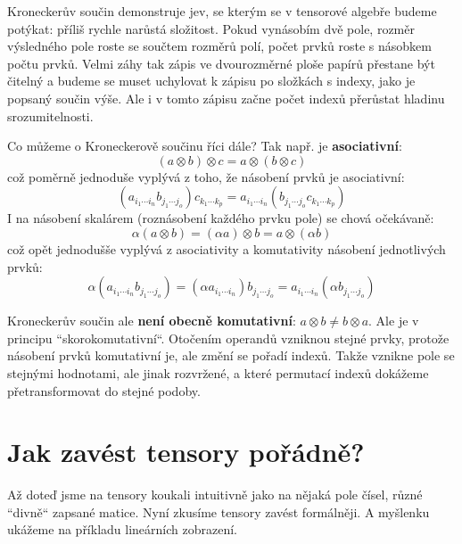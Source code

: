 \documentclass[a5paper,12pt]{amsbook}
\theoremstyle{definition}
\begin{document}
Kroneckerův součin demonstruje jev, se kterým se v tensorové algebře budeme potýkat: příliš rychle
narůstá složitost. Pokud vynásobím dvě pole, rozměr výsledného pole roste se součtem rozměrů polí,
počet prvků roste s násobkem počtu prvků. Velmi záhy tak zápis ve dvourozměrné ploše papírů přestane
být čitelný a budeme se muset uchylovat k zápisu po složkách s indexy, jako je popsaný součin výše.
Ale i v tomto zápisu začne počet indexů přerůstat hladinu srozumitelnosti.

Co můžeme o Kroneckerově součinu říci dále? Tak např. je \textbf{asociativní}:
\begin{equation*}
(a \otimes b) \otimes c = a \otimes (b \otimes c)
\end{equation*}
což poměrně jednoduše vyplývá z toho, že násobení prvků je asociativní:
\begin{equation*}
(a_{i_1 \cdots i_n} b_{j_1 \cdots j_o})c_{k_1 \cdots k_p} = a_{i_1 \cdots i_n} (b_{j_1 \cdots j_o} c_{k_1 \cdots k_p})
\end{equation*}
I na násobení skalárem (roznásobení každého prvku pole) se chová očekávaně:
\begin{equation*}
\alpha (a \otimes b) = (\alpha a) \otimes b = a \otimes (\alpha b)
\end{equation*}
což opět jednodušše vyplývá z asociativity a komutativity násobení jednotlivých prvků:
\begin{equation*}
\alpha (a_{i_1 \cdots i_n} b_{j_1 \cdots j_o}) = (\alpha a_{i_1 \cdots i_n}) b_{j_1 \cdots j_o}
= a_{i_1 \cdots i_n} (\alpha b_{j_1 \cdots j_o})
\end{equation*}

Kroneckerův součin ale \textbf{není obecně komutativní}: $a \otimes b \neq b \otimes a$. Ale
je v principu ``skorokomutativní``. Otočením operandů vzniknou stejné prvky, protože násobení
prvků komutativní je, ale změní se pořadí indexů. Takže vznikne pole se stejnými hodnotami,
ale jinak rozvržené, a které permutací indexů dokážeme přetransformovat do stejné podoby.

\section{Jak zavést tensory pořádně?}

\noindent
Až doteď jsme na tensory koukali intuitivně jako na nějaká pole čísel, různé ``divně`` zapsané matice.
Nyní zkusíme tensory zavést formálněji. A myšlenku ukážeme na příkladu lineárních zobrazení.
\end{document}

